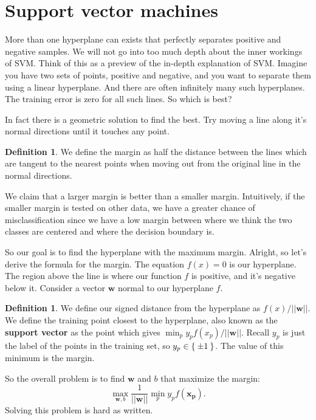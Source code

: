 \documentclass{amsbook}
\theoremstyle{plain}
\numberwithin{section}{chapter}
\numberwithin{equation}{chapter}
\theoremstyle{definition}
\newtheorem{Def}[theorem]{Definition}
\theoremstyle{remark}
\newcommand{\vecc}{\mathbf}
\newcommand{\fracc}{\frac}
\begin{document}
\section{Support vector machines}


More than one hyperplane can exists that perfectly separates positive and negative samples. We will not go into too much depth about the inner workings of SVM. Think of this as a preview of the in-depth explanation of SVM. Imagine you have two sets of points, positive and negative, and you want to separate them using a linear hyperplane. And there are often infinitely many such hyperplanes. The training error is zero for all such lines. So which is best? 

In fact there is a geometric solution to find the best. Try moving a line along it's normal directions until it touches any point. 

\begin{Def}
We define the margin as half the distance between the lines which are tangent to the nearest points when moving out from the original line in the normal directions. 
\end{Def}

We claim that a larger margin is better than a smaller margin. Intuitively, if the smaller margin is tested on other data, we have a greater chance of misclassification since we have a low margin between where we think the two classes are centered and where the decision boundary is. 


So our goal is to find the hyperplane with the maximum margin. Alright, so let's derive the formula for the margin. The equation $f(x) = 0$ is our hyperplane. The region above the line is where our function $f$ is positive, and it's negative below it. Consider a vector $\vecc{w}$ normal to our hyperplane $f$. 


\begin{Def}
We define our signed distance from the hyperplane as $f(x)/||\vecc{w}||$. We define the training point closest to the hyperplane, also known as the \textbf{support vector} as the point which gives $\min_py_pf(x_p)/||\vecc{w}||$. Recall $y_p$ is just the label of the points in the training set, so $y_p \in \Set{\pm 1}$. The value of this minimum is the margin. 
\end{Def}

So the overall problem is to find $\vecc{w}$ and $b$ that maximize the margin:
$$
\max_{\vecc{w},b}\fracc{1}{||\vecc{w}||}\min_p y_p f(\vecc{x_p}).
$$
Solving this problem is hard as written. 
\end{document}
